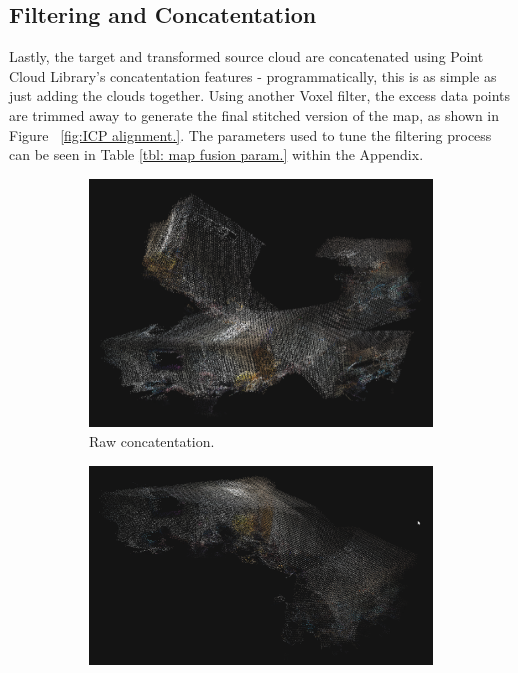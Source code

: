 \documentclass[letterpaper, oneside, 10pt]{report}
\begin{document}
    \subsection{Filtering and Concatentation}

    Lastly, the target and transformed source cloud are concatenated using Point Cloud Library's concatentation features - programmatically, this is as simple as just adding the clouds together. Using another Voxel filter, the excess data points are trimmed away to generate the final stitched version of the map, as shown in Figure ~\ref{fig:ICP alignment.}. The parameters used to tune the filtering process can be seen in Table \ref{tbl: map fusion param.} within the Appendix. \\

\begin{figure}[h]
    \centering
    \begin{subfigure}[h]{0.31\textwidth}
        \centering
        \includegraphics[width=\textwidth]{images/fusion_raw}
        \caption{Raw concatentation.}
        \label{fig:Raw concatentation.}
    \end{subfigure}
    \hfill
    \begin{subfigure}[h]{0.31\textwidth}
        \centering
        \includegraphics[width=\textwidth]{images/fusion_scia}

\end{subfigure}
\end{figure}
\end{document}
